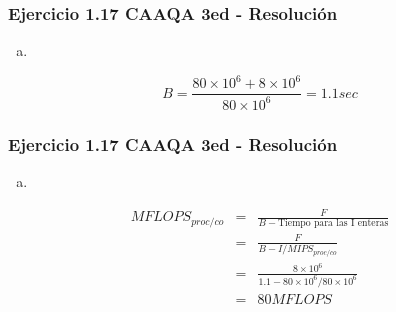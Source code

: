 \documentclass{beamer}
\begin{document}
\begin{frame}
\frametitle{Ejercicio 1.17 CAAQA 3ed - Resolución}
\begin{enumerate}[c.]
\item
\end{enumerate}

\[ B = \frac{80 \times 10^6 + 8 \times 10^6}{80 \times 10^6} = 1.1 sec \]
\end{frame}

\begin{frame}
\frametitle{Ejercicio 1.17 CAAQA 3ed - Resolución}
\begin{enumerate}[e.]
\item
\end{enumerate}
\begin{eqnarray*}
MFLOPS_{proc/co} &=& \frac{F}{B - \text{Tiempo para las I enteras}} \\
 &=& \frac{F}{B - I / MIPS_{proc/co}} \\
  &=& \frac{8 \times 10^6}{1.1 - 80 \times 10^6 / 80 \times 10^6} \\
 &=& 80 MFLOPS
\end{eqnarray*}
\end{frame}
\end{document}
